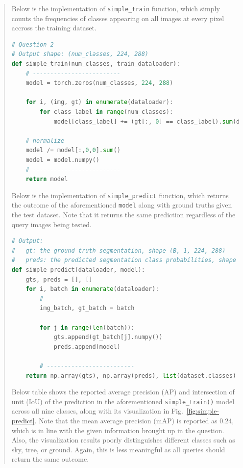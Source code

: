 \documentclass[11pt]{article}
\begin{document}
\begin{quote}

Below is the implementation of \texttt{simple\_train} function, which simply counts the frequencies of classes appearing on all images at every pixel accross the training dataset.

\begin{lstlisting}[language=Python, basicstyle=\scriptsize]
# Question 2
# Output shape: (num_classes, 224, 288)
def simple_train(num_classes, train_dataloader):
    # -------------------------
    model = torch.zeros(num_classes, 224, 288)

    for i, (img, gt) in enumerate(dataloader):
        for class_label in range(num_classes):
            model[class_label] += (gt[:, 0] == class_label).sum(dim=0)

    # normalize
    model /= model[:,0,0].sum()
    model = model.numpy()
    # -------------------------
    return model
\end{lstlisting}

Below is the implementation of \texttt{simple\_predict} function, which returns the outcome of the aforementioned \texttt{model} along with ground truths given the test dataset. Note that it returns the same prediction regardless of the query images being tested.

\begin{lstlisting}[language=Python, basicstyle=\scriptsize]
# Output:
#   gt: the ground truth segmentation, shape (B, 1, 224, 288)
#   preds: the predicted segmentation class probabilities, shape (B, 9, 224, 288) 
def simple_predict(dataloader, model):
    gts, preds = [], []
    for i, batch in enumerate(dataloader):
        # -------------------------
        img_batch, gt_batch = batch
        
        for j in range(len(batch)):
            gts.append(gt_batch[j].numpy())
            preds.append(model)
        
        # -------------------------
    return np.array(gts), np.array(preds), list(dataset.classes)
\end{lstlisting}

Below table shows the reported average precision (AP) and intersection of unit (IoU) of the prediction in the aforementioned \texttt{simple\_train()} model across all nine classes, along with its visualization in Fig.~\ref{fig:simple-predict}. Note that the mean average precision (mAP) is reported as 0.24, which is in line with the given information brought up in the question. Also, the visualization results poorly distinguishes different classes such as sky, tree, or ground. Again, this is less meaningful as all queries should return the same outcome.


\end{quote}
\end{document}
